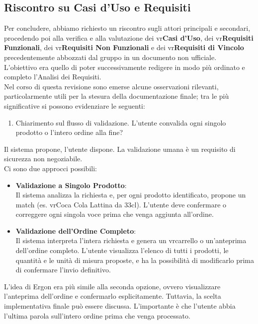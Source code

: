 \subsection{Riscontro su Casi d'Uso e Requisiti}
    Per concludere, abbiamo richiesto un riscontro sugli attori principali e secondari, procedendo poi alla verifica e alla valutazione dei vr{\textbf{Casi d’Uso}}, dei vr{\textbf{Requisiti Funzionali}}, dei vr{\textbf{Requisiti Non Funzionali}} e dei vr{\textbf{Requisiti di Vincolo}} precedentemente abbozzati dal gruppo in un documento non ufficiale.\\
    L’obiettivo era quello di poter successivamente redigere in modo più ordinato e completo l’Analisi dei Requisiti.\\
    Nel corso di questa revisione sono emerse alcune osservazioni rilevanti, particolarmente utili per la stesura della documentazione finale; tra le più significative si possono evidenziare le seguenti:
    \begin{enumerate}[resume*, itemsep=0pt, parsep=1pt, leftmargin=*, label=\arabic*.]
        \item Chiarimento sul flusso di validazione. L'utente convalida ogni singolo prodotto o l'intero ordine alla fine?
    \end{enumerate} \vspace{-0.5em}
    Il sistema propone, l'utente dispone. La validazione umana è un requisito di sicurezza non negoziabile.\\
    Ci sono due approcci possibili:\vspace{-0.1em}
    \begin{itemize}[itemsep=0pt, parsep=1pt, label=$\scriptstyle\bullet$]
	    \item \textbf{Validazione a Singolo Prodotto}: \\Il sistema analizza la richiesta e, per ogni prodotto identificato, propone un match (es. vr{Coca Cola Lattina da 33cl}). L'utente deve confermare o correggere ogni singola voce prima che venga aggiunta all'ordine.
	    \item \textbf{Validazione dell'Ordine Completo}: \\Il sistema interpreta l'intera richiesta e genera un vr{carrello} o un'anteprima dell'ordine completo. L'utente visualizza l'elenco di tutti i prodotti, le quantità e le unità di misura proposte, e ha la possibilità di modificarlo prima di confermare l'invio definitivo.
	\end{itemize}
    L'idea di Ergon era più simile alla seconda opzione, ovvero visualizzare l'anteprima dell'ordine e confermarlo esplicitamente. Tuttavia, la scelta implementativa finale può essere discussa. L'importante è che l'utente abbia l'ultima parola sull'intero ordine prima che venga processato.

